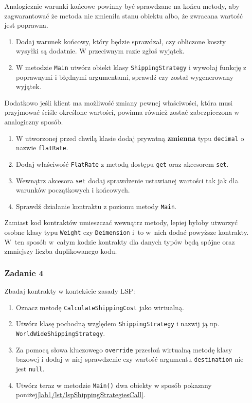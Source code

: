 Analogicznie warunki końcowe powinny być sprawdzane na końcu metody, aby zagwarantować że metoda nie zmieniła stanu obiektu albo, że zwracana wartość jest poprawna. 

\begin{enumerate}
	\item Dodaj warunek końcowy, który będzie sprawdzał, czy obliczone koszty wysyłki są dodatnie. W przeciwnym razie zgłoś wyjątek.
	\item W metodzie \texttt{Main} utwórz obiekt klasy \texttt{ShippingStrategy} i wywołaj funkcję z poprawnymi i błędnymi argumentami, sprawdź czy został wygenerowany wyjątek.
\end{enumerate}

Dodatkowo jeśli klient ma możliwość zmiany pewnej właściwości, która musi przyjmować ściśle określone wartości, powinna również zostać zabezpieczona w analogiczny sposób.

\begin{enumerate}
	\item W utworzonej przed chwilą klasie dodaj prywatną \textbf{zmienna} typu \texttt{decimal} o nazwie \texttt{flatRate}.
	\item Dodaj właściwość \texttt{FlatRate} z metodą dostępu \texttt{get} oraz akcesorem \texttt{set}.
	\item Wewnątrz akcesora \texttt{set} dodaj sprawdzenie ustawianej wartości tak jak dla warunków początkowych i końcowych.
	\item Sprawdź działanie kontraktu z poziomu metody \texttt{Main}.
\end{enumerate}

Zamiast kod kontraktów umieszczać wewnątrz metody, lepiej byłoby utworzyć osobne klasy typu \texttt{Weight} czy \texttt{Deimension} i~to w~nich dodać powyższe kontrakty. W~ten sposób w~całym kodzie kontrakty dla danych typów będą spójne oraz zmniejszy liczba duplikowanego kodu. 

\subsubsection{Zadanie 4}
Zbadaj kontrakty w kontekście zasady LSP:
\begin{enumerate}
	\item Oznacz metodę \texttt{CalculateShippingCost} jako wirtualną.
	\item Utwórz klasę pochodną względem \texttt{ShippingStrategy} i nazwij ją np. \texttt{WorldWideShippingStrategy}.
	\item Za pomocą słowa kluczowego \texttt{override} przesłoń wirtualną metodę klasy bazowej i dodaj w niej sprawdzenie czy wartość argumentu \texttt{destination} nie jest \texttt{null}.
	\item Utwórz teraz w metodzie \texttt{Main()} dwa obiekty w sposób pokazany poniżej\ref{lab1/lst/lspShippingStrategiesCall}. 
\end{enumerate}

